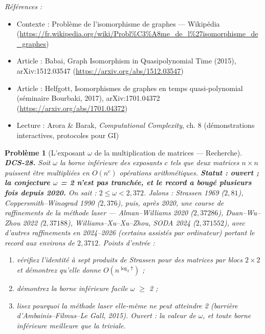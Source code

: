 \documentclass[11pt]{article}
\newtheorem{problem}{Problème}
\newenvironment{refs}{\par\small\noindent\emph{Références :}\begin{itemize}\setlength\itemsep{0pt}}{\end{itemize}\normalsize}
\begin{document}
\begin{refs}
\item Contexte : Problème de l'isomorphisme de graphes --- Wikipédia (\url{https://fr.wikipedia.org/wiki/Probl%C3%A8me_de_l%27isomorphisme_de_graphes})
\item Article : Babai, \og{} Graph Isomorphism in Quasipolynomial Time \fg{} (2015), arXiv:1512.03547 (\url{https://arxiv.org/abs/1512.03547})
\item Article : Helfgott, \og{} Isomorphismes de graphes en temps quasi-polynomial \fg{} (séminaire Bourbaki, 2017), arXiv:1701.04372 (\url{https://arxiv.org/abs/1701.04372})
\item Lecture : Arora \& Barak, \textit{Computational Complexity}, ch. 8 (démonstrations interactives, protocoles pour GI)
\end{refs}

\bigskip

\begin{problem}[{L'exposant $\omega$ de la multiplication de matrices --- Recherche}]
\textbf{DCS-28.} Soit $\omega$ la borne inférieure des exposants $c$ tels que deux matrices $n \times n$ puissent être multipliées en $O(n^c)$ opérations arithmétiques. \textbf{Statut : ouvert ; la conjecture $\omega$ = 2 n'est pas tranchée, et le record a bougé plusieurs fois depuis 2020.} On sait : $2 \le \omega < 2{,}372$. Jalons : Strassen 1969 ($2{,}81$), Coppersmith--Winograd 1990 ($2{,}376$), puis, après 2020, une course de raffinements de la méthode laser --- Alman--Williams 2020 ($2{,}37286$), Duan--Wu--Zhou 2022 ($2{,}37188$), Williams--Xu--Xu--Zhou, SODA 2024 ($2{,}371552$), avec d'autres raffinements en 2024--2026 (certains assistés par ordinateur) portant le record aux environs de $2{,}3712$. Points d'entrée :
\begin{enumerate}
\item[(a)] vérifiez l'identité à sept produits de Strassen pour des matrices par blocs $2 \times 2$ et démontrez qu'elle donne $O(n^{\log_2 7})$ ;
\item[(b)] démontrez la borne inférieure facile $\omega$ $\ge$ 2 ;
\item[(c)] lisez pourquoi la méthode laser elle-même ne peut atteindre 2 (barrière d'Ambainis--Filmus--Le Gall, 2015). Ouvert : la valeur de $\omega$, et toute borne inférieure meilleure que la triviale.
\end{enumerate}

\end{problem}
\end{document}
